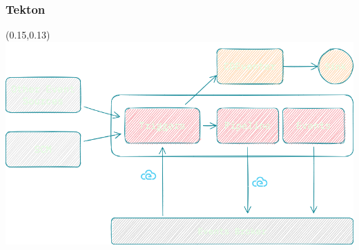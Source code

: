 \documentclass[aspectratio=169,11pt,hyperref={colorlinks=true}]{beamer}
\begin{document}
\begin{blackframe}
  \frametitle{Tekton}
  \begin{textblock*}{0.70\paperwidth}(0.15\paperwidth,0.13\paperheight)
    \includegraphics[width=0.70\paperwidth]{img/cdevents-Tekton.png}
  \end{textblock*}
\end{blackframe}
\end{document}
